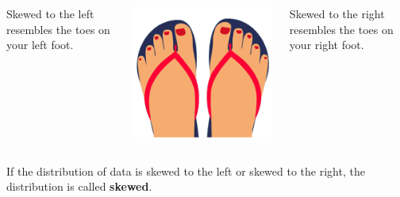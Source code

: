 \documentclass[handout]{beamer}
\begin{document}
\begin{frame}
\begin{note}
\begin{columns}
\begin{column}{0.18\textwidth}
Skewed to the left resembles the toes on your left foot.
\end{column}
\begin{column}{0.54\textwidth}
\includegraphics[width=\textwidth]{feet.png}
\end{column}
\begin{column}{0.18\textwidth}
Skewed to the right resembles the toes on your right foot.
\end{column}
\end{columns}
\end{note}\pause

\begin{definition}
If the distribution of data is skewed to the left or skewed to the right, the distribution is called \textbf{skewed}.
\end{definition}
\end{frame}
\end{document}
